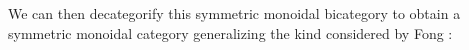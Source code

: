 \documentclass[reqno]{amsart}
\begin{document}
 

We can then decategorify this symmetric monoidal bicategory to obtain a symmetric monoidal category generalizing the kind considered by Fong \cite{Fong}:
\end{document}
